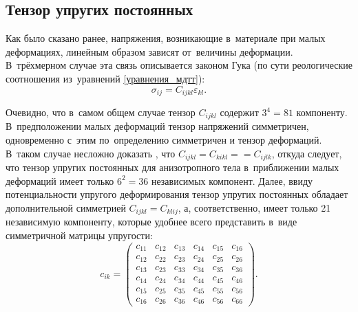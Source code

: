 \documentclass[thesis.tex]{subfiles}
\begin{document}
\subsection{Тензор упругих постоянных}

Как было сказано ранее, напряжения, возникающие в~материале при малых деформациях, линейным образом зависят от~величины
деформации. В~трёхмерном случае эта связь описывается законом Гука (по сути реологические соотношения из~уравнений
\eqref{уравнения_мдтт}):
\[
    \sigma_{ij} = C_{ijkl}\varepsilon_{kl}.
\]

Очевидно, что в~самом общем случае тензор $C_{ijkl}$ содержит  $3^4=81$ компоненту. В~предположении малых деформаций
тензор напряжений симметричен, одновременно с~этим по~определению симметричен и тензор деформаций. В~таком случае
несложно доказать \cite{реслер2011механическое}, что $C_{ijkl}=C_{kikl}=$\newline $=C_{ijlk}$, откуда следует, что тензор
упругих постоянных для анизотропного тела в~приближении малых деформаций имеет только $6^2=36$ независимых компонент.
Далее, ввиду потенциальности упругого деформирования тензор упругих постоянных обладает дополнительной симметрией
$C_{ijkl}=C_{klij}$, а, соответственно, имеет только 21 независимую компоненту, которые удобнее всего представить в~виде
симметричной матрицы упругости:
\begin{equation}
    \label{анизотропная_матрица}
    c_{ik} =\begin{pmatrix}
    c_{11} & c_{12} & c_{13} & c_{14} & c_{15} & c_{16} \\
    c_{12} & c_{22} & c_{23} & c_{24} & c_{25} & c_{26} \\
    c_{13} & c_{23} & c_{33} & c_{34} & c_{35} & c_{36} \\
    c_{14} & c_{24} & c_{34} & c_{44} & c_{45} & c_{46} \\
    c_{15} & c_{25} & c_{35} & c_{45} & c_{55} & c_{56} \\
    c_{16} & c_{26} & c_{36} & c_{46} & c_{56} & c_{66}
    \end{pmatrix}.
\end{equation}
\end{document}
